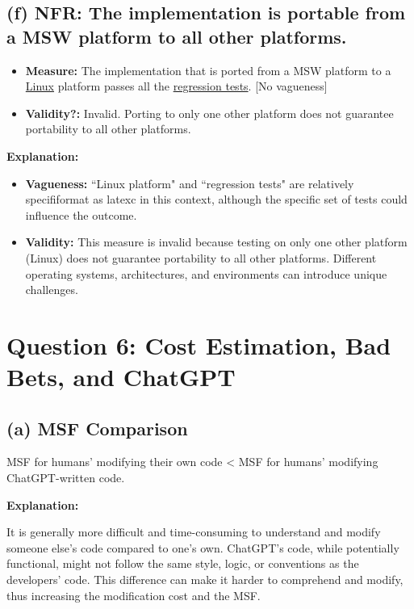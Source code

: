 \documentclass{article}
\begin{document}
\subsection*{(f) NFR: The implementation is portable from a MSW platform to all other platforms.}

\begin{itemize}
    \item \textbf{Measure:} The implementation that is ported from a MSW platform to a \underline{Linux} platform passes all the \underline{regression tests}. [No vagueness]
    \item \textbf{Validity?:} Invalid. Porting to only one other platform does not guarantee portability to all other platforms.
\end{itemize}

\textbf{Explanation:}

\begin{itemize}
    \item \textbf{Vagueness:} ``Linux platform" and ``regression tests" are relatively specififormat as latexc in this context, although the specific set of tests could influence the outcome.
    \item \textbf{Validity:} This measure is invalid because testing on only one other platform (Linux) does not guarantee portability to all other platforms. Different operating systems, architectures, and environments can introduce unique challenges.
\end{itemize}

\section*{Question 6: Cost Estimation, Bad Bets, and ChatGPT}

\subsection*{(a) MSF Comparison}

MSF for humans' modifying their own code < MSF for humans' modifying ChatGPT-written code. \checkmark

\textbf{Explanation:}

It is generally more difficult and time-consuming to understand and modify someone else's code compared to one's own. ChatGPT's code, while potentially functional, might not follow the same style, logic, or conventions as the developers' code. This difference can make it harder to comprehend and modify, thus increasing the modification cost and the MSF.
\end{document}

